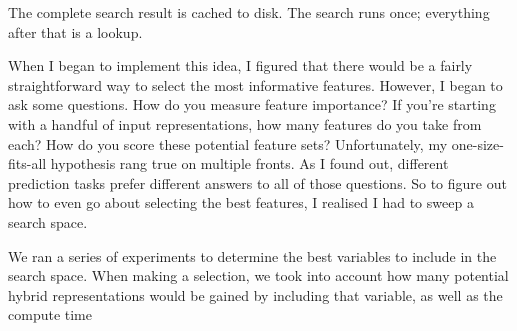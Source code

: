
The complete search result is cached to disk. The search runs once; everything after that is a lookup.

When I began to implement this idea, I figured that there would be a fairly straightforward way to select the most informative features. However, I began to ask some questions. How do you measure feature importance? If you're starting with a handful of input representations, how many features do you take from each? How do you score these potential feature sets?  Unfortunately, my one-size-fits-all hypothesis rang true on multiple fronts. As I found out, different prediction tasks prefer different answers to all of those questions. So to figure out how to even go about selecting the best features, I realised I had to sweep a search space.

We ran a series of experiments to determine the best variables to include in the search space.
When making a selection, we took into account how many potential hybrid representations would be gained by including that variable, as well as the compute time


